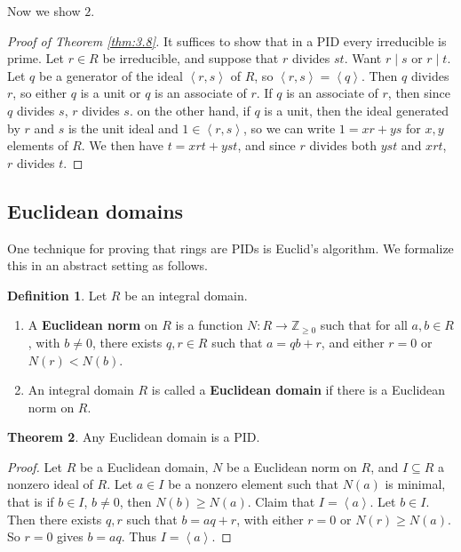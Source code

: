 \documentclass{article}
\newcommand{\Z}{\mathbb{Z}}
\newcommand{\rb}[1]{\left( #1 \right)}
\newcommand{\ab}[1]{\left\langle #1 \right\rangle}
\theoremstyle{definition}\newtheorem{definition}{Definition}[section]
\theoremstyle{definition}\newtheorem{remark}[definition]{Remark}
\theoremstyle{definition}\newtheorem*{example}{Example}
\theoremstyle{definition}\newtheorem*{note}{Note}
\newtheorem{theorem}[definition]{Theorem}
\begin{document}
Now we show $ 2 $.

\begin{proof}[Proof of Theorem \ref{thm:3.8}]
It suffices to show that in a PID every irreducible is prime. Let $ r \in R $ be irreducible, and suppose that $ r $ divides $ st $. Want $ r \mid s $ or $ r \mid t $. Let $ q $ be a generator of the ideal $ \ab{r, s} $ of $ R $, so $ \ab{r, s} = \ab{q} $. Then $ q $ divides $ r $, so either $ q $ is a unit or $ q $ is an associate of $ r $. If $ q $ is an associate of $ r $, then since $ q $ divides $ s $, $ r $ divides $ s $. on the other hand, if $ q $ is a unit, then the ideal generated by $ r $ and $ s $ is the unit ideal and $ 1 \in \ab{r, s} $, so we can write $ 1 = xr + ys $ for $ x, y $ elements of $ R $. We then have $ t = xrt + yst $, and since $ r $ divides both $ yst $ and $ xrt $, $ r $ divides $ t $.
\end{proof}


\subsection{Euclidean domains}

One technique for proving that rings are PIDs is Euclid's algorithm. We formalize this in an abstract setting as follows.

\begin{definition}
Let $ R $ be an integral domain.
\begin{enumerate}
\item A \textbf{Euclidean norm} on $ R $ is a function $ N : R \to \Z_{\ge 0} $ such that for all $ a, b \in R $, with $ b \ne 0 $, there exists $ q, r \in R $ such that $ a = qb + r $, and either $ r = 0 $ or $ N\rb{r} < N\rb{b} $.
\item An integral domain $ R $ is called a \textbf{Euclidean domain} if there is a Euclidean norm on $ R $.
\end{enumerate}
\end{definition}

\begin{theorem}
Any Euclidean domain is a PID.
\end{theorem}

\begin{proof}
Let $ R $ be a Euclidean domain, $ N $ be a Euclidean norm on $ R $, and $ I \subseteq R $ a nonzero ideal of $ R $. Let $ a \in I $ be a nonzero element such that $ N\rb{a} $ is minimal, that is if $ b \in I $, $ b \ne 0 $, then $ N\rb{b} \ge N\rb{a} $. Claim that $ I = \ab{a} $. Let $ b \in I $. Then there exists $ q, r $ such that $ b = aq + r $, with either $ r = 0 $ or $ N\rb{r} \ge N\rb{a} $. So $ r = 0 $ gives $ b = aq $. Thus $ I = \ab{a} $.
\end{proof}
\end{document}
